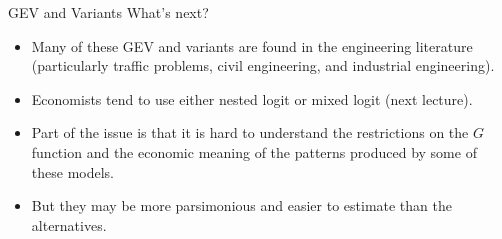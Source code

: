 \documentclass[aspectratio=169,11pt]{beamer}
\begin{document}
\begin{frame}{GEV and Variants}
What's next?
\begin{itemize}
\item Many of these GEV and variants are found in the engineering literature (particularly traffic problems, civil engineering, and industrial engineering).
\item Economists tend to use either nested logit or mixed logit (next lecture).
\item Part of the issue is that it is hard to understand the restrictions on the $G$ function and the economic meaning of the patterns produced by some of these models.
\item But they may be more parsimonious and easier to estimate than the alternatives.
\end{itemize}
\end{frame}
\end{document}
